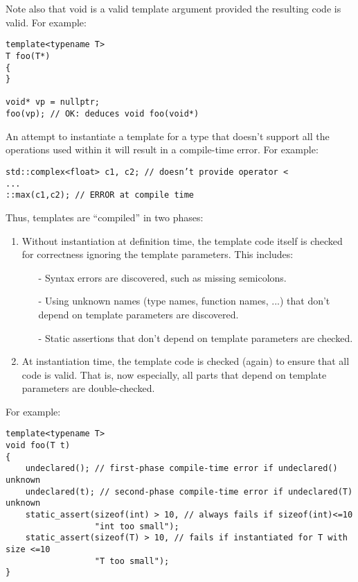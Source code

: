 Note also that void is a valid template argument provided the resulting code is valid. For example:

\begin{lstlisting}[style=styleCXX]
template<typename T>
T foo(T*)
{
}

void* vp = nullptr;
foo(vp); // OK: deduces void foo(void*)
\end{lstlisting}


An attempt to instantiate a template for a type that doesn’t support all the operations used within it will result in a compile-time error. For example:

\begin{lstlisting}[style=styleCXX]
std::complex<float> c1, c2; // doesn’t provide operator <
...
::max(c1,c2); // ERROR at compile time
\end{lstlisting}

Thus, templates are “compiled” in two phases:

\begin{enumerate}
\item 
Without instantiation at definition time, the template code itself is checked for correctness ignoring the template parameters. This includes:
\begin{itemize}
\item[-] 
Syntax errors are discovered, such as missing semicolons.

\item[-]
Using unknown names (type names, function names, ...) that don’t depend on template parameters are discovered.

\item[-]
Static assertions that don’t depend on template parameters are checked.
\end{itemize}

\item 
At instantiation time, the template code is checked (again) to ensure that all code is valid. That is, now especially, all parts that depend on template parameters are double-checked.
\end{enumerate}

For example:

\begin{lstlisting}[style=styleCXX]
template<typename T>
void foo(T t)
{
	undeclared(); // first-phase compile-time error if undeclared() unknown
	undeclared(t); // second-phase compile-time error if undeclared(T) unknown
	static_assert(sizeof(int) > 10, // always fails if sizeof(int)<=10
				  "int too small");
	static_assert(sizeof(T) > 10, // fails if instantiated for T with size <=10
	              "T too small");
}
\end{lstlisting}


